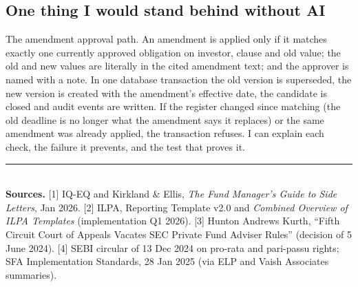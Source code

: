 \documentclass[10pt,a4paper]{article}
\begin{document}
\subsection{One thing I would stand behind without AI}
The amendment approval path. An amendment is applied only if it matches exactly one currently approved obligation on investor, clause and old value; the old and new values are literally in the cited amendment text; and the approver is named with a note. In one database transaction the old version is superseded, the new version is created with the amendment's effective date, the candidate is closed and audit events are written. If the register changed since matching (the old deadline is no longer what the amendment says it replaces) or the same amendment was already applied, the transaction refuses. I can explain each check, the failure it prevents, and the test that proves it.

\vfill
{\footnotesize\color{black!70}\rule{\linewidth}{0.4pt}\\
\textbf{Sources.} [1] IQ-EQ and Kirkland \& Ellis, \emph{The Fund Manager's Guide to Side Letters}, Jan 2026. [2] ILPA, Reporting Template v2.0 and \emph{Combined Overview of ILPA Templates} (implementation Q1 2026). [3] Hunton Andrews Kurth, ``Fifth Circuit Court of Appeals Vacates SEC Private Fund Adviser Rules'' (decision of 5 June 2024). [4] SEBI circular of 13 Dec 2024 on pro-rata and pari-passu rights; SFA Implementation Standards, 28 Jan 2025 (via ELP and Vaish Associates summaries).}
\end{document}
